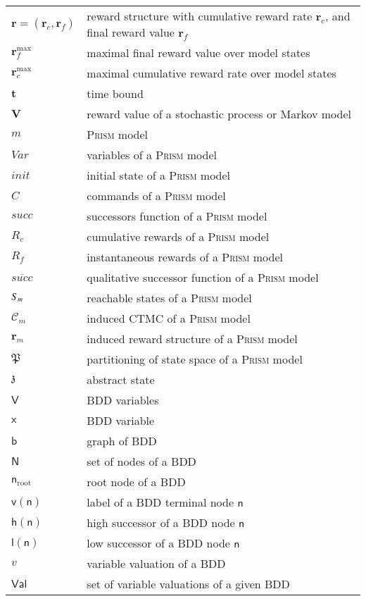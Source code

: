 \documentclass[10pt,twocolumn]{article}
\newcommand{\PRISM}{\textsc{Prism}\xspace}
\newcommand{\states} {{\ensuremath S}}
\newcommand{\cmodel}{\mathcal{C}}
\newcommand{\rew}{\mathbf{r}}
\newcommand{\frew}{\mathbf{r}_f}
\newcommand{\crew}{\mathbf{r}_c}
\newcommand{\timeb}{\mathbf{t}}
\newcommand{\mvalue}{\mathbf{V}}
\newcommand{\apart}{\mathfrak{P}}
\newcommand{\astate}{\mathfrak{z}}
\newcommand{\bdd}{\mathsf{b}}
\newcommand{\bddVars}{\mathsf{V}}
\newcommand{\bddVar}{\mathsf{x}}
\newcommand{\bddNodeInit}{\bddNode_{\mathrm{root}}}
\newcommand{\bddNodes}{\mathsf{N}}
\newcommand{\bddNode}{\mathsf{n}}
\newcommand{\bddHi}{\mathsf{h}}
\newcommand{\bddLo}{\mathsf{l}}
\newcommand{\bddNV}{\mathsf{v}}
\newcommand{\bddEval}{\mathsf{Val}}
\newcommand{\prismModel}{m}
\newcommand{\prismVars}{\mathit{Var}}
\newcommand{\prismInit}{\mathit{init}}
\newcommand{\prismSucc}{\mathit{succ}}
\newcommand{\prismNSucc}{\overline{\prismSucc}}
\newcommand{\prismCmds}{C}
\newcommand{\prismCRew}{R_c}
\newcommand{\prismFRew}{R_f}
\begin{document}
\begin{supertabular}{p{1.6cm}p{5.7cm}}
  $\rew = (\crew, \frew)$ & reward structure with cumulative reward rate $\crew$, and final reward value $\frew$\\
  $\frew^{\max}$ & maximal final reward value over model states\\
  $\crew^{\max}$ & maximal cumulative reward rate over model states\\
  $\timeb$ & time bound\\
  $\mvalue$ & reward value of a stochastic process or Markov model\\
  $\prismModel$ & \PRISM model\\
  $\prismVars$ & variables of a \PRISM model\\
  $\prismInit$ & initial state of a \PRISM model\\
  $\prismCmds$ & commands of a \PRISM model\\
  $\prismSucc$ & successors function of a \PRISM model\\
  $\prismCRew$ & cumulative rewards of a \PRISM model\\
  $\prismFRew$ & instantaneous rewards of a \PRISM model\\
  $\prismNSucc$ & qualitative successor function of a \PRISM model\\
  $\states_{\prismModel}$ & reachable states of a \PRISM model\\
  $\cmodel_\prismModel$ & induced CTMC of a \PRISM model\\
  $\rew_\prismModel$ & induced reward structure of a \PRISM model\\
  $\apart$ & partitioning of state space of a \PRISM model\\
  $\astate$ & abstract state\\
  $\bddVars$ & BDD variables\\
  $\bddVar$ & BDD variable\\
  $\bdd$ & graph of BDD\\
  $\bddNodes$ & set of nodes of a BDD\\
  $\bddNodeInit$ & root node of a BDD\\
  $\bddNV(\bddNode)$ & label of a BDD terminal node $\bddNode$\\
  $\bddHi(\bddNode)$ & high successor of a BDD node $\bddNode$\\
  $\bddLo(\bddNode)$ & low successor of a BDD node $\bddNode$\\
  $v$ & variable valuation of a BDD\\
  $\bddEval$ & set of variable valuations of a given BDD\\

\end{supertabular}
\end{document}
